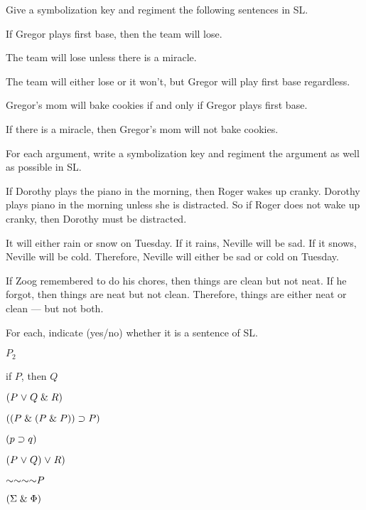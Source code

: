 \solutions
\problempart
\label{pr.gregorbaseball}
Give a symbolization key and regiment the following sentences in SL.
\begin{earg}
\item If Gregor plays first base, then the team will lose.
\item The team will lose unless there is a miracle.
\item The team will either lose or it won't, but Gregor will play first base regardless.
\item Gregor's mom will bake cookies if and only if Gregor plays first base.
\item If there is a miracle, then Gregor's mom will not bake cookies.
\end{earg}


\problempart
\label{pr.choresSL}
For each argument, write a symbolization key and regiment the argument as well as possible in SL.
\begin{earg}
\item If Dorothy plays the piano in the morning, then Roger wakes up cranky. Dorothy plays piano in the morning unless she is distracted. So if Roger does not wake up cranky, then Dorothy must be distracted.
\item It will either rain or snow on Tuesday. If it rains, Neville will be sad. If it snows, Neville will be cold. Therefore, Neville will either be sad or cold on Tuesday.
\item If Zoog remembered to do his chores, then things are clean but not neat. If he forgot, then things are neat but not clean. Therefore, things are either neat or clean --- but not both.
\end{earg}



\problempart
\label{HW2.A}
For each, indicate (yes/no) whether it is a sentence of SL.
\begin{earg}
		\item $P_{2}$
		\item if $P$, then $Q$
		\item $(P \mkern1mu\vee\mkern1mu Q \mathrel\& R)$
		\item $((P \mathrel\& (P \mathrel\& P)) \supset P)$
		\item $(p \supset q)$
		\item $(P \mkern1mu\vee\mkern1mu Q) \mkern1mu\vee\mkern1mu R)$
		\item $\enot \enot \enot \enot P$
		\item $(\Sigma \mathrel\& \Phi)$
	\end{earg}

